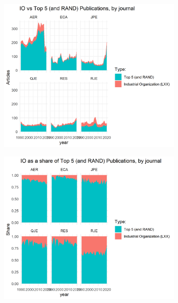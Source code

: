 \documentclass[11pt, letterpaper, twoside]{article}
\begin{document}
\begin{figure}
    \begin{subfigure}[h]{0.49\textwidth}
        \centering
        \includegraphics[width=\textwidth]{LXX-code-share-area-by-journal.png}
    \end{subfigure}
    \hfill
    \begin{subfigure}[h]{0.49\textwidth}
        \centering
        \includegraphics[width=\textwidth]{LXX-code-share-area-normalized-by-journal.png}
    \end{subfigure}
\end{figure}
\end{document}
